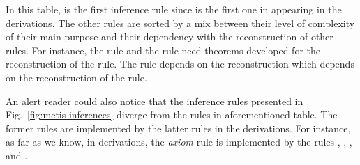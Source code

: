 \documentclass[../main.tex]{subfiles}
\begin{document}
In this table, \strip is the first inference rule since is the first
one in appearing in the \TSTP derivations. The other rules are sorted
by a mix between their level of complexity of their main purpose and
their dependency with the reconstruction of other rules. For
instance, the \simplify rule and the \clausify rule need theorems
developed for the reconstruction of the \canonicalize rule. The
\canonicalize rule depends on the \resolve reconstruction which
depends on the reconstruction of the \conjunct rule.

An alert reader could also notice that the inference rules presented in
Fig.~\ref{fig:metis-inferences} diverge from the rules in
aforementioned table. The former rules are implemented by the latter
rules in the \TSTP derivations. For instance, as far as we know, in
\TSTP derivations,  the \emph{axiom} rule is implemented by the rules
\canonicalize, \clausify, \conjunct, and \simplify.

\end{document}
